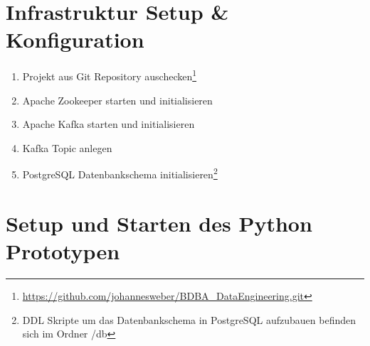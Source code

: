 \section{Infrastruktur Setup \& Konfiguration}
\begin{enumerate}
	\item Projekt aus Git Repository auschecken\footnote{\hyperref[hier]{https://github.com/johannesweber/BDBA\_DataEngineering.git}}
	\item Apache Zookeeper starten und initialisieren
	\item Apache Kafka starten und initialisieren
	\item Kafka Topic anlegen
	\item PostgreSQL Datenbankschema initialisieren\footnote{DDL Skripte um das Datenbankschema in PostgreSQL aufzubauen befinden sich im Ordner /db}
\end{enumerate}

\section{Setup und Starten des Python Prototypen }

